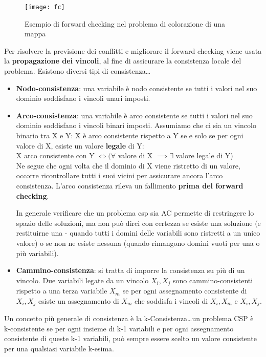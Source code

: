 \begin{figure}[H]
\centering
\texttt{[image: fc]}
\caption{Esempio di forward checking nel problema di colorazione di una mappa}
\label{fig:fc}
\end{figure}

Per risolvere la previsione dei conflitti e migliorare il forward checking viene
usata la \textbf{propagazione dei vincoli}, al fine di assicurare la
consistenza locale del problema. Esistono diversi tipi di consistenza\dots

\begin{itemize}
 \item \textbf{Nodo-consistenza}: una variabile è nodo consistente se tutti
i valori nel suo dominio soddisfano i vincoli unari imposti.
 \item \textbf{Arco-consistenza}: una variabile è arco consistente se tutti
i valori nel suo dominio soddisfano i vincoli binari imposti.
Assumiamo che ci sia un vincolo binario tra X e Y: X è arco consistente
rispetto a Y se e solo se per ogni valore di X, esiste un valore \textbf{legale}
di Y:\\

X arco consistente con Y $\iff (\forall$ valore di X $\implies \exists$ valore
legale di Y)\\

Ne segue che ogni volta che il dominio di X viene ristretto di un valore,
occorre ricontrollare tutti i suoi vicini per assicurare ancora l'arco consistenza.
L'arco consistenza rileva un fallimento \textbf{prima del forward checking}.

In generale verificare che un problema csp sia AC permette di restringere lo spazio
delle soluzioni, ma non può dirci con certezza se esiste una soluzione (e
restituirne una - quando tutti i domini delle variabili sono ristretti a un unico
valore) o se non ne esiste nessuna (quando rimangono domini vuoti per una o più variabili).
 \item \textbf{Cammino-consistenza}: si tratta di imporre la consistenza su più di un
vincolo. Due variabili legate da un vincolo ${X_i, X_j}$ sono cammino-consistenti rispetto
a una terza variabile $X_m$ se per ogni assegnamento consistente di
${X_i, X_j}$ esiste un assegnamento di $X_m$ che soddisfa i vincoli di ${X_i, X_m}$
e ${X_i, X_j}$.
\end{itemize}

Un concetto più generale di consistenza è la k-Consistenza\dots un problema
CSP è k-consistente se per ogni insieme di k-1 variabili e per ogni assegnamento
consistente di queste k-1 variabili, può sempre essere scelto un valore consistente
per una qualsiasi variabile k-esima.

